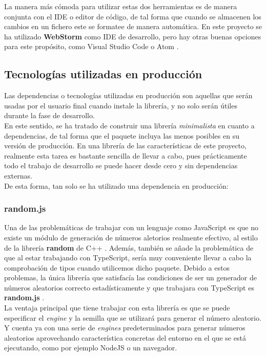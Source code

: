  La manera más cómoda para utilizar estas dos herramientas es de manera conjunta con el IDE o editor de código, de tal forma que cuando se almacenen los cambios en un fichero este se formatee de manera automática. En este proyecto se ha utilizado \textbf{WebStorm} \cite{webstorm} como IDE de desarrollo, pero hay otras buenas opciones para este propósito, como Visual Studio Code \cite{vscode} o Atom \cite{atom}.

\subsection{Tecnologías utilizadas en producción}

Las dependencias o tecnologías utilizadas en producción son aquellas que serán usadas por el usuario final cuando instale la librería, y no solo serán útiles durante la fase de desarrollo. \\

En este sentido, se ha tratado de construir una librería \textit{minimalista} en cuanto a dependencias, de tal forma que el paquete incluya las menos posibles en su versión de producción. En una librería de las características de este proyecto, realmente esta tarea es bastante sencilla de llevar a cabo, pues prácticamente todo el trabajo de desarrollo se puede hacer desde cero y sin dependencias externas.\\

De esta forma, tan solo se ha utilizado una dependencia en producción:

\subsubsection{random.js}

Una de las problemáticas de trabajar con un lenguaje como JavaScript es que no existe un módulo de generación de números aletorios realmente efectivo, al estilo de la librería \textbf{random} de C++ \cite{randomcpp}. Además, también se añade la problemática de que al estar trabajando con TypeScript, sería muy conveniente llevar a cabo la comprobación de tipos cuando utilicemos dicho paquete. Debido a estos problemas, la única librería que satisfacía las condiciones de ser un generador de números aleatorios correcto estadísticamente y que trabajara con TypeScript es \textbf{random.js} \cite{randomjs}. \\

La ventaja principal que tiene trabajar con esta librería es que se puede especificar el \textit{engine} y la semilla que se utilizará para generar el número aleatorio. Y cuenta ya con una serie de \textit{engines} predeterminados para generar números aleatorios aprovechando característica concretas del entorno en el que se está ejecutando, como por ejemplo NodeJS o un navegador. \\

